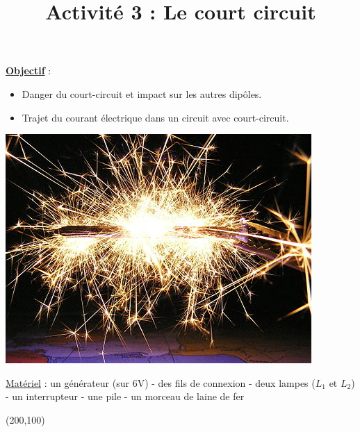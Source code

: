 \documentclass[10pt]{article}
\newcommand{\titreActivite}{Activité 3 : Le court circuit} %
\newcommand{\objectif}{ 	
	
	\begin{itemize}
		\item Danger du court-circuit et impact sur les autres dipôles.
		\item Trajet du courant électrique dans un circuit avec court-circuit.
	\end{itemize}
} %
\newcommand{\contexte}{
	Nous abordons les courts-circuits, un des plus dangereux phénomènes de la vie de tous les jours.
}
\begin{document}
\date{}
\title{\titreActivite}
\maketitle %


\underline{\textbf{Objectif}} :  \vspace{2pt}
\objectif

\vspace{4pt}


\begin{center}
	\includegraphics[width=0.55\columnwidth]{activité.jpg} %
\end{center}

\vspace{-20pt}


\underline{Matériel} : un générateur (sur 6V) - des fils de connexion - deux lampes ($L_1$ et $L_2$) - un interrupteur - une
pile - un morceau de laine de fer



\begin{minipage}[c]{0.45\textwidth}
	\begin{question}
	\end{question}
\end{minipage}
\hspace{ 20pt}
\begin{minipage}[c]{0.45\textwidth}
	\begin{center}
		\framebox(200,100){}
	\end{center}
\end{minipage}
\end{document}
